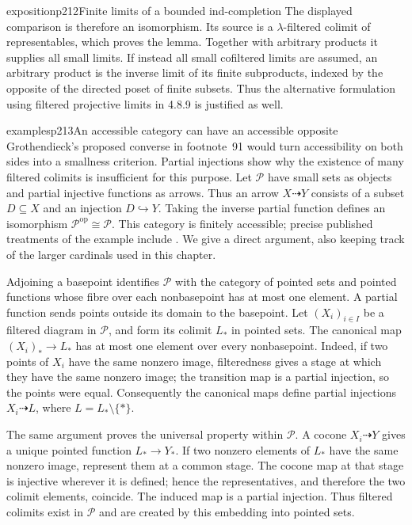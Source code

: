 \begin{dcomment}{exposition}{p212}{Finite limits of a bounded ind-completion}
The displayed comparison is therefore an isomorphism. Its source is a $\lambda$-filtered colimit of representables, which proves the lemma. Together with arbitrary products it supplies all small limits. If instead all small cofiltered limits are assumed, an arbitrary product is the inverse limit of its finite subproducts, indexed by the opposite of the directed poset of finite subsets. Thus the alternative formulation using filtered projective limits in 4.8.9 is justified as well.
\end{dcomment}

\begin{dcomment}{examples}{p213}{An accessible category can have an accessible opposite}
Grothendieck's proposed converse in footnote~91 would turn accessibility on both sides into a smallness criterion. Partial injections show why the existence of many filtered colimits is insufficient for this purpose. Let $\mathcal P$ have small sets as objects and partial injective functions as arrows. Thus an arrow $X\dashrightarrow Y$ consists of a subset $D\subseteq X$ and an injection $D\hookrightarrow Y$. Taking the inverse partial function defines an isomorphism $\mathcal P^{\mathrm{op}}\cong\mathcal P$. This category is finitely accessible; precise published treatments of the example include \citet[\S3.2, Proposition~3.6, Lemma~3.8, Theorem~3.9]{Heunen2013L2}. We give a direct argument, also keeping track of the larger cardinals used in this chapter.

Adjoining a basepoint identifies $\mathcal P$ with the category of pointed sets and pointed functions whose fibre over each nonbasepoint has at most one element. A partial function sends points outside its domain to the basepoint. Let $(X_i)_{i\in I}$ be a filtered diagram in $\mathcal P$, and form its colimit $L_*$ in pointed sets. The canonical map $(X_i)_*\to L_*$ has at most one element over every nonbasepoint. Indeed, if two points of $X_i$ have the same nonzero image, filteredness gives a stage at which they have the same nonzero image; the transition map is a partial injection, so the points were equal. Consequently the canonical maps define partial injections $X_i\dashrightarrow L$, where $L=L_*\setminus\{*\}$.

The same argument proves the universal property within $\mathcal P$. A cocone $X_i\dashrightarrow Y$ gives a unique pointed function $L_*\to Y_*$. If two nonzero elements of $L_*$ have the same nonzero image, represent them at a common stage. The cocone map at that stage is injective wherever it is defined; hence the representatives, and therefore the two colimit elements, coincide. The induced map is a partial injection. Thus filtered colimits exist in $\mathcal P$ and are created by this embedding into pointed sets.


\end{dcomment}
